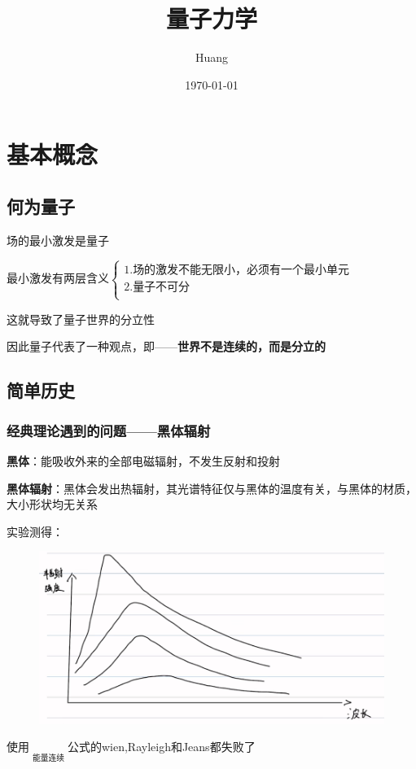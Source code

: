 \documentclass[lang=cn,15pt]{elegantbook}
\title{量子力学}
\author{Huang}
\date{\today}
\begin{document}
	
	\maketitle
	\frontmatter
	
	\tableofcontents
	
	\mainmatter
\chapter{基本概念}
\section{何为量子}

场的最小激发是量子

最小激发有两层含义$\begin{cases}
	1.\text{场的激发不能无限小，必须有一个最小单元}\\
	2.\text{量子不可分}\\
\end{cases}$

这就导致了量子世界的分立性

因此量子代表了一种观点，即——\textbf{世界不是连续的，而是分立的}
\section{简单历史}
\subsection{经典理论遇到的问题——黑体辐射}

\textbf{黑体}：能吸收外来的全部电磁辐射，不发生反射和投射

\textbf{黑体辐射}：黑体会发出热辐射，其光谱特征仅与黑体的温度有关，与黑体的材质，大小形状均无关系

实验测得：

\begin{figure}[H]
	\centering
	\includegraphics[width=0.5\linewidth]{figure/screenshot001}
\end{figure}

使用$\mathop {\underbrace{\text{经典理论}}} \limits_{\text{能量连续}}$公式的wien,Rayleigh和Jeans都失败了
\end{document}
